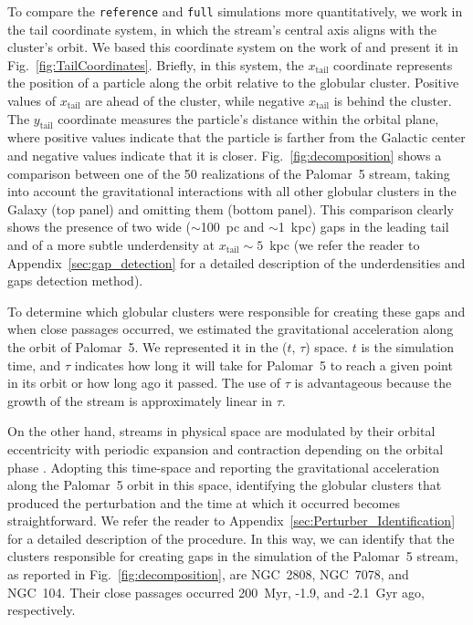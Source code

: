 \documentclass{aa}
\begin{document}
    To compare the \texttt{reference} and \texttt{full} simulations more quantitatively, we work in the tail coordinate system, in which the stream's central axis aligns with the cluster's orbit. We based this coordinate system on the work of \citet{2004AJ....127.2753D} and present it in Fig.~\ref{fig:TailCoordinates}. Briefly, in this system, the $x_{\textrm{tail}}$ coordinate represents the position of a particle along the orbit relative to the globular cluster. Positive values of $x_{\textrm{tail}}$ are ahead of the cluster, while negative $x_{\textrm{tail}}$ is behind the cluster. The $y_{\textrm{tail}}$ coordinate measures the particle's distance within the orbital plane, where positive values indicate that the particle is farther from the Galactic center and negative values indicate that it is closer. Fig.~\ref{fig:decomposition} shows a comparison between one of the 50 realizations of the Palomar~5 stream, taking into account the gravitational interactions with all other globular clusters in the Galaxy (top panel) and omitting them (bottom panel). This comparison clearly shows the presence of two wide ($\sim$100~pc and $\sim$1~kpc) gaps in the leading tail and of a more subtle underdensity at $x_{\textrm{tail}}\sim 5$~kpc (we refer the reader to Appendix~\ref{sec:gap_detection} for a detailed description of the underdensities and gaps detection method). 
    
    To determine which globular clusters were responsible for creating these gaps and when close passages occurred, we estimated the gravitational acceleration along the orbit of Palomar~5. We represented it in the ($t$, $\tau$) space. $t$ is the simulation time, and $\tau$ indicates how long it will take for Palomar~5 to reach a given point in its orbit or how long ago it passed. The use of $\tau$ is advantageous because the growth of the stream is approximately linear in $\tau$. 
    
    On the other hand, streams in physical space are modulated by their orbital eccentricity with periodic expansion and contraction depending on the orbital phase \citep[see the top panel of Fig.~5.][for an example]{2016MNRAS.457.3817S}. Adopting this time-space and reporting the gravitational acceleration along the Palomar~5 orbit in this space, identifying the globular clusters that produced the perturbation and the time at which it occurred becomes straightforward. We refer the reader to Appendix~\ref{sec:Perturber_Identification} for a detailed description of the procedure. In this way, we can identify that the clusters responsible for creating gaps in the simulation of the Palomar~5 stream, as reported in Fig.~\ref{fig:decomposition}, are NGC~2808, NGC~7078, and NGC~104. Their close passages occurred 200~Myr, -1.9, and -2.1~Gyr ago, respectively. 
    
\end{document}

